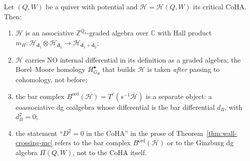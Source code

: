 \begin{theorem}
\label{thm:coha-is-algebra-not-coalgebra}
Let $(Q, W)$ be a quiver with potential and
$\mathcal{H} = \mathcal{H}(Q, W)$ its critical CoHA. Then:
\begin{enumerate}[label=\textup{(\roman*)}]
 \item $\mathcal{H}$ is an associative $\mathbb{Z}^{Q_0}$-graded
 algebra over $\mathbb{C}$ with Hall product
 $m_H \colon \mathcal{H}_{\mathbf{d}_1} \otimes \mathcal{H}_{\mathbf{d}_2}
 \to \mathcal{H}_{\mathbf{d}_1 + \mathbf{d}_2}$;
 \item $\mathcal{H}$ carries NO internal differential in its definition
 as a graded algebra; the Borel--Moore homology $H^{\bullet}_{G_\mathbf{d}}$
 that builds $\mathcal{H}$ is taken \emph{after} passing to cohomology,
 not before;
 \item the bar complex $B^{\mathrm{ord}}(\mathcal{H}) = T^c(s^{-1} \bar{\mathcal{H}})$
 is a separate object: a coassociative dg coalgebra whose differential
 is the bar differential $d_B$, with $d_B^2 = 0$;
 \item the statement ``$D^2 = 0$ in the CoHA'' in the prose of
 Theorem~\textup{\ref{thm:wall-crossing-mc}} refers to the bar
 complex $B^{\mathrm{ord}}(\mathcal{H})$ or to the Ginzburg dg algebra
 $\Pi(Q, W)$, not to the CoHA itself.
\end{enumerate}
\end{theorem}

